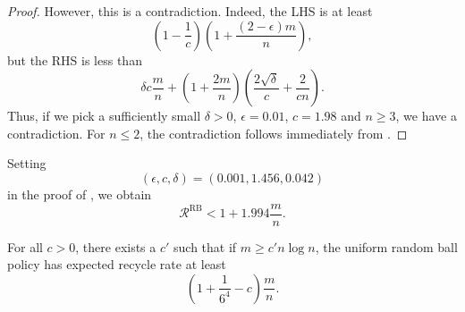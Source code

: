 \begin{proof}
However, this is a contradiction. Indeed, the LHS is at least 
$$
\left(1-\frac{1}{c}\right)\left(1+\frac{(2-\epsilon)m}{n}\right),
$$
but the RHS is less than
$$
\delta c \frac{m}{n} + \left(1+\frac{2m}{n}\right)\left(\frac{2\sqrt{\delta}}{c}+\frac{2}{cn}\right).
$$
Thus, if we pick a sufficiently small $\delta > 0$, $\epsilon = 0.01$, $c=1.98$
and $n\geq 3$, we have a contradiction. For $n \le 2$, the contradiction follows
immediately from .
\end{proof}

\begin{corollary}\label{cor:rbuni-upper-constants}
	Setting
	\begin{equation*}
		(\epsilon, c, \delta) = (0.001, 1.456, 0.042)
	\end{equation*}
	in the proof of , we obtain 
	\begin{equation*}
		\mathcal{R}^\textrm{RB} < 1 + 1.994\frac{m}{n}.
	\end{equation*}
\end{corollary}

\begin{lemma}\label{lem:rbuni-lower} For all $c > 0$, there exists a
  $c'$ such that if $m \ge c' n\log n$, the uniform random ball policy
  has expected recycle rate at least   
$$
 	\left(1+\frac{1}{6^4} - c\right)\frac{m}{n}.
$$
\end{lemma}

